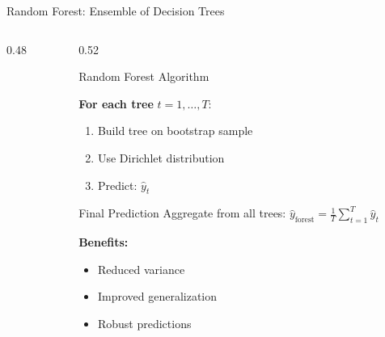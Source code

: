 \documentclass[aspectratio=169]{beamer}
\begin{document}
\begin{frame}{Random Forest: Ensemble of Decision Trees}
\begin{columns}[T]
\begin{column}{0.48\textwidth}
\end{column}

\begin{column}{0.52\textwidth}
\vspace{-0.3cm}
\begin{block}{Random Forest Algorithm}
{\small
\textbf{For each tree} $t = 1, \ldots, T$:
\begin{enumerate}
    \item Build tree on bootstrap sample
    \item Use Dirichlet distribution
    \item Predict: $\hat{y}_t$
\end{enumerate}
}
\end{block}

\vspace{0.2cm}

\begin{exampleblock}{Final Prediction}
{\small
Aggregate from all trees:
$\boxed{\hat{y}_{\text{forest}} = \frac{1}{T}\sum_{t=1}^{T} \hat{y}_t}$
}
\vspace{0.1cm}
{\small
\textbf{Benefits:}
\begin{itemize}
    \item Reduced variance
    \item Improved generalization
    \item Robust predictions
\end{itemize}
}
\end{exampleblock}
\end{column}
\end{columns}
\end{frame}
\end{document}
